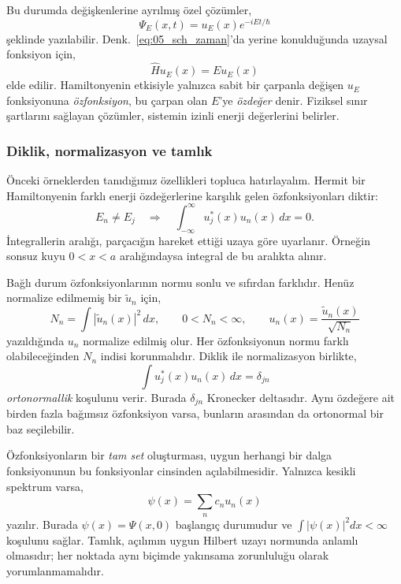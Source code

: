 Bu durumda değişkenlerine ayrılmış özel çözümler,
\begin{equation}
 \Psi_E(x,t)=u_E(x)e^{-iEt/\hbar}
 \label{eq:05_duragan}
\end{equation}
şeklinde yazılabilir. Denk.~\eqref{eq:05_sch_zaman}'da yerine
konulduğunda uzaysal fonksiyon için,
\begin{equation}
 \boxed{\hat H u_E(x)=E u_E(x)}
 \label{eq:05_enerji_ozdeger}
\end{equation}
elde edilir. Hamiltonyenin etkisiyle yalnızca sabit bir çarpanla
değişen $u_E$ fonksiyonuna \emph{özfonksiyon}, bu çarpan olan $E$'ye
\emph{özdeğer} denir. Fiziksel sınır şartlarını sağlayan çözümler,
sistemin izinli enerji değerlerini belirler.

\subsubsection{Diklik, normalizasyon ve tamlık}

Önceki örneklerden tanıdığımız özellikleri topluca hatırlayalım.
Hermit bir Hamiltonyenin farklı enerji özdeğerlerine karşılık gelen
özfonksiyonları diktir:
\begin{equation}
 E_n\ne E_j\quad\Longrightarrow\quad
 \int_{-\infty}^{\infty}u_j^*(x)u_n(x)\,dx=0.
 \label{eq:05_enerji_diklik}
\end{equation}
İntegrallerin aralığı, parçacığın hareket ettiği uzaya göre
uyarlanır. Örneğin sonsuz kuyu $0<x<a$ aralığındaysa integral de bu
aralıkta alınır.

Bağlı durum özfonksiyonlarının normu sonlu ve sıfırdan farklıdır.
Henüz normalize edilmemiş bir $\widetilde u_n$ için,
\begin{equation}
 N_n=\int|\widetilde u_n(x)|^2\,dx,
 \qquad 0<N_n<\infty,
 \qquad u_n(x)=\frac{\widetilde u_n(x)}{\sqrt{N_n}}
\end{equation}
yazıldığında $u_n$ normalize edilmiş olur. Her özfonksiyonun normu
farklı olabileceğinden $N_n$ indisi korunmalıdır. Diklik ile
normalizasyon birlikte,
\begin{equation}
 \int u_j^*(x)u_n(x)\,dx=\delta_{jn}
 \label{eq:05_ortonormal}
\end{equation}
\emph{ortonormallik} koşulunu verir. Burada $\delta_{jn}$ Kronecker
deltasıdır. Aynı özdeğere ait birden fazla bağımsız özfonksiyon varsa,
bunların arasından da ortonormal bir baz seçilebilir.

Özfonksiyonların bir \emph{tam set} oluşturması, uygun herhangi bir
dalga fonksiyonunun bu fonksiyonlar cinsinden açılabilmesidir. Yalnızca
kesikli spektrum varsa,
\begin{equation}
 \psi(x)=\sum_n c_nu_n(x)
 \label{eq:05_enerji_acilim}
\end{equation}
yazılır. Burada $\psi(x)=\Psi(x,0)$ başlangıç durumudur ve
$\int|\psi(x)|^2dx<\infty$ koşulunu sağlar. Tamlık, açılımın uygun
Hilbert uzayı normunda anlamlı olmasıdır; her noktada aynı biçimde
yakınsama zorunluluğu olarak yorumlanmamalıdır.

